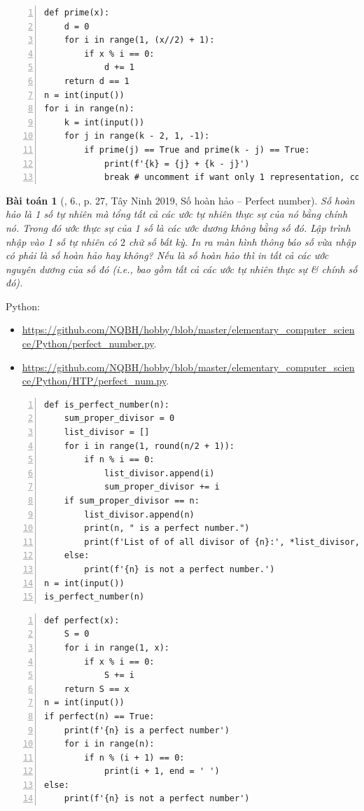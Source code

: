 \documentclass{article}
\newtheorem{baitoan}{Bài toán}
\begin{document}
\begin{Verbatim}[numbers=left,xleftmargin=5mm]
def prime(x):
    d = 0
    for i in range(1, (x//2) + 1):
        if x % i == 0:
            d += 1
    return d == 1
n = int(input())
for i in range(n):
    k = int(input())
    for j in range(k - 2, 1, -1):
        if prime(j) == True and prime(k - j) == True:
            print(f'{k} = {j} + {k - j}')
            break # uncomment if want only 1 representation, comment if want all satisfied representations
\end{Verbatim}

\begin{baitoan}[\cite{VietSTEM2021}, 6., p. 27, Tây Ninh 2019, Số hoàn hảo -- Perfect number]
	\emph{Số hoàn hảo} là 1 số tự nhiên mà tổng tất cả các ước tự nhiên thực sự của nó bằng chính nó. Trong đó ước thực sự của 1 số là các ước dương không bằng số đó. Lập trình nhập vào 1 số tự nhiên có $2$ chữ số bất kỳ. In ra màn hình thông báo số vừa nhập có phải là số hoàn hảo hay không? Nếu là số hoàn hảo thì in tất cả các ước nguyên dương của số đó (i.e., bao gồm tất cả các ước tự nhiên thực sự \& chính số đó).
\end{baitoan}
Python:
\begin{itemize}
	\item \url{https://github.com/NQBH/hobby/blob/master/elementary_computer_science/Python/perfect_number.py}.
	\item \url{https://github.com/NQBH/hobby/blob/master/elementary_computer_science/Python/HTP/perfect_num.py}.
\end{itemize}

\begin{Verbatim}[numbers=left,xleftmargin=5mm]
def is_perfect_number(n):
    sum_proper_divisor = 0
    list_divisor = []
    for i in range(1, round(n/2 + 1)):
        if n % i == 0:
            list_divisor.append(i)
            sum_proper_divisor += i
    if sum_proper_divisor == n:
        list_divisor.append(n)
        print(n, " is a perfect number.")
        print(f'List of of all divisor of {n}:', *list_divisor, '.')
    else:
        print(f'{n} is not a perfect number.')
n = int(input())
is_perfect_number(n)
\end{Verbatim}

\begin{Verbatim}[numbers=left,xleftmargin=5mm]
def perfect(x):
    S = 0
    for i in range(1, x):
        if x % i == 0:
            S += i
    return S == x
n = int(input())
if perfect(n) == True:
    print(f'{n} is a perfect number')
    for i in range(n):
        if n % (i + 1) == 0:
            print(i + 1, end = ' ')
else:
    print(f'{n} is not a perfect number')
\end{Verbatim}
\end{document}
